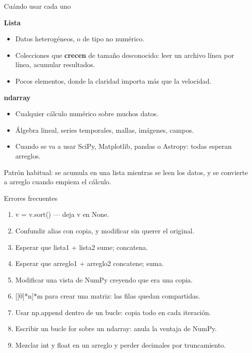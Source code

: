 \documentclass[aspectratio=169, 11pt]{beamer}
\newcommand{\code}[1]{{\ttfamily\small\color{textoOscuro}#1}}
\newcommand{\subt}[1]{%
  \par\smallskip
  \noindent{\color{borgonaClaro}\rule{3pt}{0.95em}}\hspace{0.5em}%
  {\color{borgonaMedio}\bfseries #1}\par\vspace{0.3em}
}
\begin{document}
\begin{frame}{Cuándo usar cada uno}
\small
\subt{Lista}
\begin{itemize}
  \item Datos heterogéneos, o de tipo no numérico.
  \item Colecciones que \textbf{crecen} de tamaño desconocido: leer un archivo línea por línea, acumular resultados.
  \item Pocos elementos, donde la claridad importa más que la velocidad.
\end{itemize}

\subt{ndarray}
\begin{itemize}
  \item Cualquier cálculo numérico sobre muchos datos.
  \item Álgebra lineal, series temporales, mallas, imágenes, campos.
  \item Cuando se va a usar SciPy, Matplotlib, pandas o Astropy: todas esperan arreglos.
\end{itemize}
\begin{cita}
Patrón habitual: se acumula en una lista mientras se leen los datos, y se
convierte a arreglo cuando empieza el cálculo.
\end{cita}
\end{frame}

\begin{frame}[fragile]{Errores frecuentes}
\begin{enumerate}\small
  \item \code{v = v.sort()} — deja \code{v} en \code{None}.
  \item Confundir alias con copia, y modificar sin querer el original.
  \item Esperar que \code{lista1 + lista2} sume; concatena.
  \item Esperar que \code{arreglo1 + arreglo2} concatene; suma.
  \item Modificar una vista de NumPy creyendo que era una copia.
  \item \code{[[0]*n]*m} para crear una matriz: las filas quedan compartidas.
  \item Usar \code{np.append} dentro de un bucle: copia todo en cada iteración.
  \item Escribir un bucle \code{for} sobre un ndarray: anula la ventaja de NumPy.
  \item Mezclar \code{int} y \code{float} en un arreglo y perder decimales por truncamiento.
\end{enumerate}
\end{frame}
\end{document}
